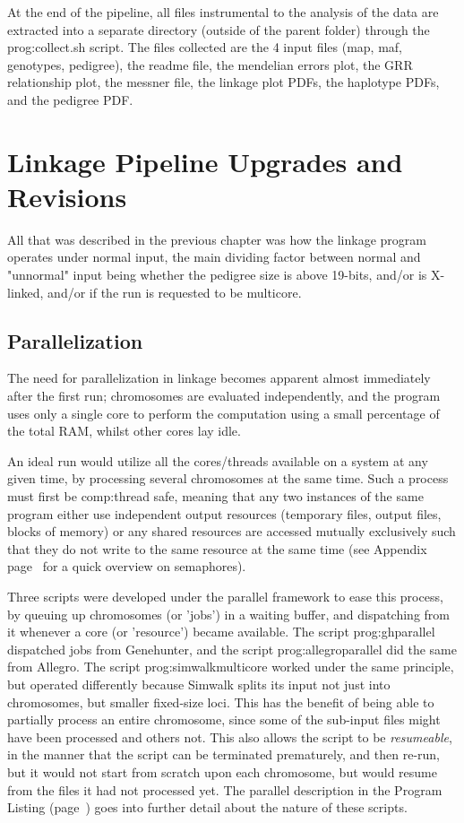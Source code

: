 At the end of the pipeline, all files instrumental to the analysis of the data are extracted into a separate directory (outside of the parent folder) through the \gls{prog:collect.sh} script. The files collected are the 4 input files (map, maf, genotypes, pedigree), the readme file, the mendelian errors plot, the GRR relationship plot, the messner file, the linkage plot PDFs, the haplotype PDFs, and the pedigree PDF.


\section{Linkage Pipeline Upgrades and Revisions}

All that was described in the previous chapter was how the linkage program operates under normal input, the main dividing factor between normal and "unnormal" input being whether the pedigree size is above 19-bits, and/or is X-linked, and/or if the run is requested to be multicore.

\subsection{Parallelization}

The need for parallelization in linkage becomes apparent almost immediately after the first run; chromosomes are evaluated independently, and the program uses only a single core to perform the computation using a small percentage of the total RAM, whilst other cores lay idle.

An ideal run would utilize all the cores/threads available on a system at any given time, by processing several chromosomes at the same time.  Such a process must first be \gls{comp:thread safe}, meaning that any two instances of the same program either use independent output resources (temporary files, output files, blocks of memory) or any shared resources are accessed mutually exclusively such that they do not write to the same resource at the same time (see Appendix page~\pageref{ref:app:semaphores} for a quick overview on semaphores).

Three scripts were developed under the parallel framework to ease this process, by queuing up chromosomes (or 'jobs') in a waiting buffer, and dispatching from it whenever a core (or 'resource') became available. The script \gls{prog:ghparallel} dispatched jobs from Genehunter, and the script \gls{prog:allegroparallel} did the same from Allegro. The script \gls{prog:simwalkmulticore}\label{ref:meth:simwalkmulti} worked under the same principle, but operated differently because Simwalk splits its input not just into chromosomes, but smaller fixed-size loci. This has the benefit of being able to partially process an entire chromosome, since some of the sub-input files might have been  processed and others not. This also allows the script to be \textit{resumeable}, in the manner that the script can be terminated prematurely, and then re-run, but it would not start from scratch upon each chromosome, but would resume from the files it had not processed yet. The parallel description in the Program Listing (page~\pageref{ref:meth:proglist}) goes into further detail about the nature of these scripts.

